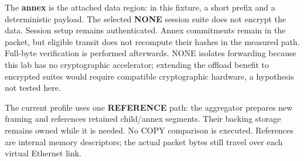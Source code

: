 \documentclass[10pt,a4paper]{article}
\newcommand{\sectionlabel}[1]{\par\vspace{4pt}{\large\bfseries #1}\par}
\begin{document}
The \textbf{annex} is the attached data region: in this fixture, a short prefix and a deterministic payload. The selected \textbf{NONE} session suite does not encrypt the data. Session setup remains authenticated. Annex commitments remain in the packet, but eligible transit does not recompute their hashes in the measured path. Full-byte verification is performed afterwards. NONE isolates forwarding because this lab has no cryptographic accelerator; extending the offload benefit to encrypted suites would require compatible cryptographic hardware, a hypothesis not tested here.
\sectionlabel{Reference-based forwarding}
The current profile uses one \textbf{REFERENCE} path: the aggregator prepares new framing and references retained child/annex segments. Their backing storage remains owned while it is needed. No COPY comparison is executed. References are internal memory descriptors; the actual packet bytes still travel over each virtual Ethernet link.
\end{document}
